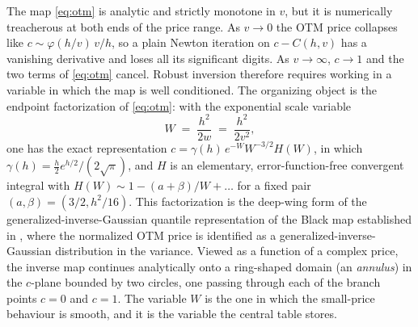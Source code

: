 \documentclass[11pt]{article}
\begin{document}
The map \eqref{eq:otm} is analytic and strictly monotone in $v$, but it is numerically treacherous at both ends of the price range. As $v\to0$ the OTM price collapses like $c\sim \varphi(h/v)\,v/h$, so a plain Newton iteration on $c-C(h,v)$ has a vanishing derivative and loses all its significant digits. As $v\to\infty$, $c\to1$ and the two terms of \eqref{eq:otm} cancel. Robust inversion therefore requires working in a variable in which the map is well conditioned. The organizing object is the endpoint factorization of \eqref{eq:otm}: with the exponential scale variable
\begin{equation}\label{eq:Wdef}
  W \;=\; \frac{h^2}{2w} \;=\; \frac{h^2}{2v^2},
\end{equation}
one has the exact representation $c=\gamma(h)\,e^{-W}W^{-3/2}H(W)$, in which $\gamma(h)=\tfrac{h}{2}e^{h/2}/(2\sqrt\pi)$, and $H$ is an elementary, error-function-free convergent integral with $H(W)\sim1-(a+\beta)/W+\dots$ for a fixed pair $(a,\beta)=(3/2,h^2/16)$. This factorization is the deep-wing form of the generalized-inverse-Gaussian quantile representation of the Black map established in \citet{schadner2026explicit}, where the normalized OTM price is identified as a generalized-inverse-Gaussian distribution in the variance. Viewed as a function of a complex price, the inverse map continues analytically onto a ring-shaped domain (an \emph{annulus}) in the $c$-plane bounded by two circles, one passing through each of the branch points $c=0$ and $c=1$. The variable $W$ is the one in which the small-price behaviour is smooth, and it is the variable the central table stores.\\
\end{document}

